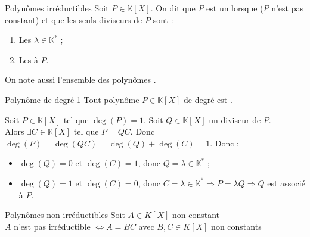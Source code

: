 \documentclass[12pt,a4paper]{report}
\begin{document}
        \begin{definition}{Polynômes irréductibles}{}
        Soit $P \in \mathbb{K}[X]$. On dit que $P$ est un  lorsque  ($P$ n'est pas constant) et que les seuls diviseurs de $P$ sont :
        \begin{multicols}{2}
        \begin{enumerate}
            \item Les  $\lambda \in \mathbb{K}^*$ ;
            \item Les  à $P$.
        \end{enumerate}
        \end{multicols}
        On note aussi  l'ensemble des polynômes .
        \end{definition}    
        
        \begin{proposition}{Polynôme de degré 1}
        Tout polynôme $P \in \mathbb{K}[X]$ de degré  est .
        \end{proposition}
        
        \begin{demo}
        Soit $P \in \mathbb{K}[X]$ tel que $\deg(P) = 1$. Soit $Q \in \mathbb{K}[X]$ un diviseur de $P$.\\
        Alors $\exists C \in \mathbb{K}[X]$ tel que $P = QC$. Donc $\deg(P) = \deg(QC) = \deg(Q) + \deg(C) = 1$. Donc :
        \begin{itemize}
            \item $\deg(Q) = 0$ et $\deg(C) = 1$, donc $Q = \lambda \in \mathbb{K}^*$ ;
            \item $\deg(Q) = 1$ et $\deg(C) = 0$, donc $C = \lambda \in \mathbb{K}^* \Rightarrow P = \lambda Q \Rightarrow Q$ est associé à $P$.
        \end{itemize}
        \end{demo}
        
        \begin{proposition}{Polynômes non irréductibles}{}
        Soit $A\in K[X]$ non constant \\
        $A$ n'est pas irréductible $\Longleftrightarrow A=BC$ avec $B,C\in K[X]$ non constants
        \end{proposition}
        
\end{document}
